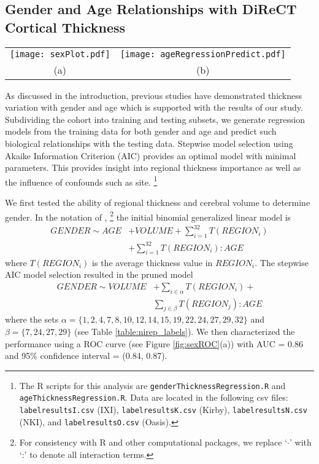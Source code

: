 \subsection{Gender and Age Relationships with DiReCT Cortical Thickness}

\begin{figure*}[htb]
  \centering
  \begin{tabular}{cc}
  \texttt{[image: sexPlot.pdf]} &
  \texttt{[image: ageRegressionPredict.pdf]} \\
  (a) &
  (b) 
  \end{tabular}
  \caption{(a) ROC curve based on a gender prediction model using total brain volume and regional thickness values (coupled with cross terms with age---cf Eqn. \ref{eq:roc}).  
  (b) Correlation plot for age prediction using regional thickness.
  }
  \label{fig:sexROC}
\end{figure*}

As discussed in the introduction, previous studies have demonstrated 
thickness variation with gender and age which is supported with
the results of our study.  Subdividing the cohort into training and
testing subsets, we generate regression models from the training data
for both gender and age and predict such biological relationships with 
the testing data. Stepwise model selection using Akaike Information Criterion
(AIC) provides an optimal model with minimal parameters.  This provides 
insight into regional thickness importance as well
as the influence of confounds such as site.%
\footnote{
The R scripts for this analysis are {\tt genderThicknessRegression.R} and
{\tt ageThicknessRegression.R}.  Data are located in the following csv files: 
{\tt labelresultsI.csv} (IXI), 
{\tt labelresultsK.csv} (Kirby),
{\tt labelresultsN.csv} (NKI), and
{\tt labelresultsO.csv} (Oasis).
}

We first tested the ability of regional thickness and cerebral volume to determine
gender.
In the notation of \cite{wilkinson1973},%
\footnote{
For consistency with R and other computational packages, we replace `$\cdot$'  
with `:' to denote all interaction terms.
}
 the initial binomial 
generalized linear model is
\begin{align}
  GENDER \sim AGE &+ VOLUME + \sum_{i=1}^{32} T(REGION_{i}) \\ \nonumber
              &+\sum_{i=1}^{32} T(REGION_{i}):AGE
\end{align}
where $T(REGION_{i})$ is the average thickness value in $REGION_{i}$.
The stepwise AIC model selection resulted in the pruned model
\begin{align}
  \label{eq:roc}
  GENDER \sim VOLUME &+ \sum_{i \in \alpha} T(REGION_i) + \\ \nonumber 
                    & \sum_{j \in \beta} T(REGION_j):AGE
\end{align}
where the sets $\alpha = \{1,2,4,7,8,10,12,14,15,19,22,24,27,29,32\}$ and $\beta = \{7,24,27,29\}$ (see Table \ref{table:nirep_labels}).  We then characterized the performance using a ROC curve (see Figure \ref{fig:sexROC}(a)) with AUC = 0.86 and 95\% confidence interval = (0.84, 0.87). 
   
